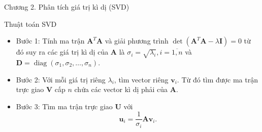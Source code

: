 \documentclass[notheorems,envcountsect,hyperref=unicode]{beamer}
\newcommand{\N}{\mathbb N}
\newcommand{\Q}{\mathbb Q}
\def\Q{\mathbb{Q}}
\def\N{\mathbb{N}}
\def\lp{\ell_p}
\def\lq{\ell_q}
\def\lo{\ell_{\infty}}
\begin{document}
%

\begin{frame}{Chương 2. Phân tích giá trị kì dị (SVD)}
\begin{block}{\textnormal{Thuật toán SVD}}
\begin{itemize}
\item{Bước 1:} Tính ma trận $\mathbf{A}^{T} \mathbf{A}$  và giải phương trình $\operatorname{det}\left(\mathbf{A}^{T} \mathbf{A}-\lambda \mathbf{I}\right)=0$ từ đó suy ra các giá trị kì dị của $\mathbf{A}$ là $\sigma_{i}=\sqrt{\lambda_{i}}, i=\overline{1, n}$ và $\mathbf{D}=\operatorname{diag}\left(\sigma_{1}, \sigma_{2}, \ldots, \sigma_{n}\right)$.
\item{Bước 2:} Với mỗi giá trị riêng $\lambda_{i}$, tìm vector riêng $\mathbf{v}_{i}$. Từ đó tìm được ma trận trực giao $\mathbf{V}$ cấp $n$ chứa các vector kì dị phải của $\mathbf{A}$.
\item{Bước 3:} Tìm ma trận trực giao $\mathbf{U}$ với 
$$
\mathbf{u}_{i}=\frac{1}{\sigma_{i}} \mathbf{A} \mathbf{v}_{i}.
$$
\end{itemize}
\end{block}

\end{frame}
\end{document}
